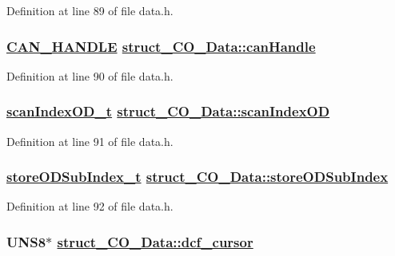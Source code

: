 Definition at line 89 of file data.h.\hypertarget{structstruct__CO__Data_c960c3c56e8389105c2853cfb393de0c}{
\subsubsection[canHandle]{\setlength{\rightskip}{0pt plus 5cm}\hyperlink{win32_2applicfg_8h_712c7b28987b12b8d400df19c92d0f5e}{CAN\_\-HANDLE} \hyperlink{structstruct__CO__Data_c960c3c56e8389105c2853cfb393de0c}{struct\_\-CO\_\-Data::can\-Handle}}}
\label{structstruct__CO__Data_c960c3c56e8389105c2853cfb393de0c}




Definition at line 90 of file data.h.\hypertarget{structstruct__CO__Data_1863bd74fef91ec89b4c1ff0bee2dfbf}{
\subsubsection[scanIndexOD]{\setlength{\rightskip}{0pt plus 5cm}\hyperlink{objdictdef_8h_a844575e4d9c9870137121bf0fb241fb}{scan\-Index\-OD\_\-t} \hyperlink{structstruct__CO__Data_1863bd74fef91ec89b4c1ff0bee2dfbf}{struct\_\-CO\_\-Data::scan\-Index\-OD}}}
\label{structstruct__CO__Data_1863bd74fef91ec89b4c1ff0bee2dfbf}




Definition at line 91 of file data.h.\hypertarget{structstruct__CO__Data_d6cd6ffa658b1ed35d887b6bacb990cf}{
\subsubsection[storeODSubIndex]{\setlength{\rightskip}{0pt plus 5cm}\hyperlink{objacces_8h_7b55b55a3f5ed8e4b2991cb85c7be7ce}{store\-ODSub\-Index\_\-t} \hyperlink{structstruct__CO__Data_d6cd6ffa658b1ed35d887b6bacb990cf}{struct\_\-CO\_\-Data::store\-ODSub\-Index}}}
\label{structstruct__CO__Data_d6cd6ffa658b1ed35d887b6bacb990cf}




Definition at line 92 of file data.h.\hypertarget{structstruct__CO__Data_de0a65bcf0cb16fd4dafe4d866655aab}{
\subsubsection[dcf\_\-cursor]{\setlength{\rightskip}{0pt plus 5cm}UNS8$\ast$ \hyperlink{structstruct__CO__Data_de0a65bcf0cb16fd4dafe4d866655aab}{struct\_\-CO\_\-Data::dcf\_\-cursor}}}
\label{structstruct__CO__Data_de0a65bcf0cb16fd4dafe4d866655aab}




